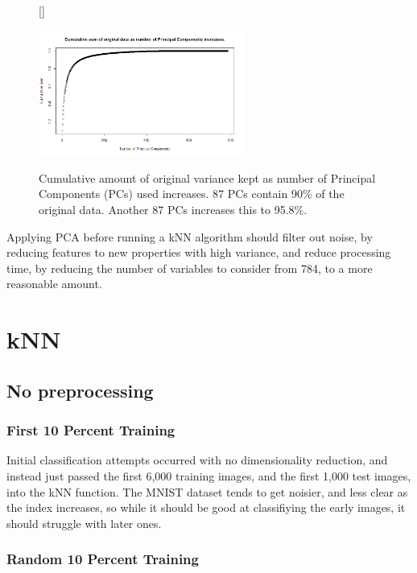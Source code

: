 \documentclass[11pt]{article} %
\begin{document}
\begin{figure}[htb!]
[\FBwidth]
{\caption{Cumulative amount of original variance kept as number of Principal Components (PCs) used increases. 87 PCs contain 90\% of the original data. Another 87 PCs increases this to 95.8\%.}\label{fig:cumsum_pca}}
{\includegraphics[width=0.6\textwidth]{cumulative_pca.png}}
\end{figure}

\vspace{-5mm}

Applying PCA before running a kNN algorithm should filter out noise, by reducing features to new properties with high variance, and reduce processing time, by reducing the number of variables to consider from 784, to a more reasonable amount.



\section{kNN}

\subsection{No preprocessing}

\subsubsection{First 10 Percent Training}

Initial classification attempts occurred with no dimensionality reduction, and instead just passed the first 6,000 training images, and the first 1,000 test images, into the kNN function. The MNIST dataset tends to get noisier, and less clear as the index increases, so while it should be good at classifiying the early images, it should struggle with later ones. 


\subsubsection{Random 10 Percent Training}
\end{document}
